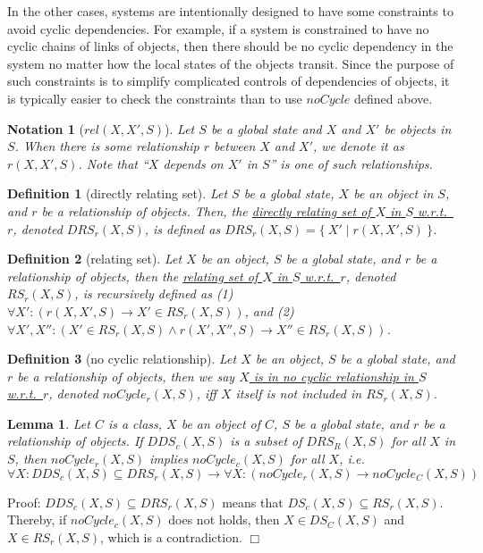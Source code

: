 \documentclass[12pt]{report}
\newtheorem{lemma}{Lemma}
\newtheorem{notation}{Notation}
\newtheorem{definition}{Definition}
\newcommand{\ra}{\rightarrow}
\newcommand{\ul}{\underline}
\begin{document}
In the other cases, systems are intentionally designed to have some constraints
to avoid cyclic dependencies. For example, if a system is constrained to
have no cyclic chains of links of objects, then there should be no
cyclic dependency in the system no matter how the local states of the
objects transit. Since the purpose of such constraints is to simplify
complicated controls of dependencies of objects, it is typically easier
to check the constraints than to use $noCycle$ defined above.

\begin{notation}[$rel(X,X',S)$]
  Let $S$ be a global state and $X$ and $X'$ be objects in $S$.  When
  there is some relationship $r$ between $X$ and $X'$, we denote it
  as \ul{$r(X,X',S)$}. Note that ``$X$ depends on $X'$ in $S$'' is one
  of such relationships.
\end{notation}

\begin{definition}[directly relating set]
Let $S$ be a global state, $X$ be an object in $S$, and $r$ be a
relationship of objects. Then, the \ul{directly relating set of $X$ in
  $S$ w.r.t.\ $r$}, denoted \ul{$DRS_r(X,S)$}, is defined as
$DRS_r(X,S)=\{~X'\mid r(X,X',S)~\}$.
\end{definition}

\begin{definition}[relating set]
Let $X$ be an object, $S$ be a global state, and $r$ be a relationship
of objects, then the \ul{relating set of $X$ in $S$
  w.r.t.\ $r$}, denoted \ul{$RS_r(X,S)$}, is recursively defined
as (1) $\forall X': (r(X,X',S) \ra X'\in RS_r(X,S))$, and (2)
$\forall X',X'': (X'\in RS_r(X,S) \land r(X',X'',S) \ra X''\in
RS_r(X,S))$.
\end{definition}

\begin{definition}[no cyclic relationship]
Let $X$ be an object, $S$ be a global state, and $r$ be a relationship
of objects, then we say \ul{$X$ is in no cyclic relationship in $S$
  w.r.t.\ $r$}, denoted \ul{$noCycle_r(X,S)$}, iff $X$ itself is not
included in $RS_r(X,S)$.
\end{definition}

\begin{lemma}
\label{lemma:simplerel}
Let $C$ is a class, $X$ be an object of $C$, $S$ be a global state,
and $r$ be a relationship of objects. If $DDS_c(X,S)$ is a subset of
$DRS_R(X,S)$ for all $X$ in $S$, then $noCycle_r(X,S)$ implies
$noCycle_c(X,S)$ for all $X$, i.e.
\[\forall X:DDS_c(X,S)\subseteq DRS_r(X,S) \ra \forall X: (noCycle_r(X,S) \ra
noCycle_C(X,S))\]
\end{lemma}
Proof: $DDS_c(X,S)\subseteq DRS_r(X,S)$ means that $DS_c(X,S)\subseteq
RS_r(X,S)$.  Thereby, if $noCycle_c(X,S)$ does not holds, then $X\in
DS_C(X,S)$ and $X\in RS_r(X,S)$, which is a contradiction. $\Box$\\
\end{document}

